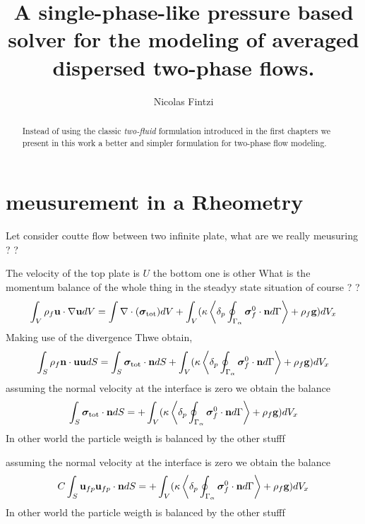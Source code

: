 \documentclass[12pt]{My_preprint}
\title{A single-phase-like pressure based solver for the modeling of averaged dispersed two-phase flows.  }
\author[1,2]{Nicolas Fintzi}
\begin{document}
\maketitle

\begin{abstract}
    Instead of using the classic \textit{two-fluid} formulation introduced in the first chapters we present in this work a better and simpler formulation for two-phase flow modeling. 
\end{abstract}




\section*{meusurement in a Rheometry}


Let consider coutte flow between two infinite plate, what are we really meusuring ? ? 

The velocity of the top plate is $U$ the bottom one is other 
What is the momentum balance of the whole thing in the steadyy state situation of course ? ? 
\begin{equation}
    \int_V \rho_f 
    \textbf{u}\cdot \mathbf{\nabla}
    \textbf{u}
    dV
    = \int 
    \mathbf{\nabla}\cdot ( \bm{\sigma}_\text{tot} )
    dV
    +\int_V 
    (\kappa 
    \left<\delta_{p} \oint_{\Gamma_{\alpha}}  \bm{\sigma}_f^0 \cdot \textbf{n} d\Gamma\right> 
    + \rho_f \textbf{g})
    dV_x
\end{equation}
Making use of the divergence Thwe obtain, 
\begin{equation}
    \int_S \rho_f 
    \textbf{n} \cdot \textbf{u}
    \textbf{u}
    dS
    = \int_S 
     \bm{\sigma}_\text{tot} \cdot \textbf{n}
    dS
    +\int_V 
    (\kappa 
    \left<\delta_{p} \oint_{\Gamma_{\alpha}}  \bm{\sigma}_f^0 \cdot \textbf{n} d\Gamma\right> 
    + \rho_f \textbf{g})
    dV_x
\end{equation}
assuming the normal velocity at the interface is zero we obtain the balance 
\begin{equation}
\int_S 
     \bm{\sigma}_\text{tot} \cdot \textbf{n}
    dS
    =
    +\int_V 
    (\kappa 
    \left<\delta_{p} \oint_{\Gamma_{\alpha}}  \bm{\sigma}_f^0 \cdot \textbf{n} d\Gamma\right> 
    + \rho_f \textbf{g})
    dV_x
\end{equation}
In other world the particle weigth is balanced by the other stufff

assuming the normal velocity at the interface is zero we obtain the balance 
\begin{equation}
C\int_S 
    \textbf{u}_{fp}\textbf{u}_{fp}\cdot \textbf{n}
    dS
    =
    +\int_V 
    (\kappa 
    \left<\delta_{p} \oint_{\Gamma_{\alpha}}  \bm{\sigma}_f^0 \cdot \textbf{n} d\Gamma\right> 
    + \rho_f \textbf{g})
    dV_x
\end{equation}
In other world the particle weigth is balanced by the other stufff
\end{document}
